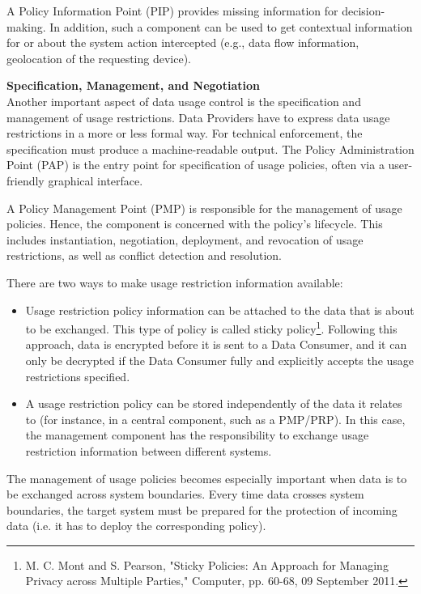 

A Policy Information Point (PIP) provides missing information for decision-making. In addition, such a component can be used to get contextual information for or about the system action intercepted (e.g., data flow information, geolocation of the requesting device).

\textbf{Specification, Management, and Negotiation}\\


Another important aspect of data usage control is the specification and management of usage restrictions. Data Providers have to express data usage restrictions in a more or less formal way. For technical enforcement, the specification must produce a machine-readable output. The Policy Administration Point (PAP) is the entry point for specification of usage policies, often via a user-friendly graphical interface.

A Policy Management Point (PMP) is responsible for the management of usage policies. Hence, the component is concerned with the policy’s lifecycle. This includes instantiation, negotiation, deployment, and revocation of usage restrictions, as well as conflict detection and resolution.

There are two ways to make usage restriction information available: 

\begin{itemize}
	\item Usage restriction policy information can be attached to the data that is about to be exchanged. This type of policy is called sticky policy\footnote{ M. C. Mont and S. Pearson, "Sticky Policies: An Approach for Managing Privacy across Multiple Parties," Computer, pp. 60-68, 09 September 2011.  }. Following this approach, data is encrypted before it is sent to a Data Consumer, and it can only be decrypted if the Data Consumer fully and explicitly accepts the usage restrictions specified. 

	\item A usage restriction policy can be stored independently of the data it relates to (for instance, in a central component, such as a PMP/PRP). In this case, the management component has the responsibility to exchange usage restriction information between different systems.
\end{itemize}

The management of usage policies becomes especially important when data is to be exchanged across system boundaries. Every time data crosses system boundaries, the target system must be prepared for the protection of incoming data (i.e. it has to deploy the corresponding policy). 


